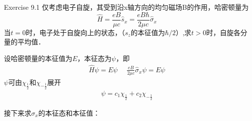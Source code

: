 
Exercise 9.1 仅考虑电子自旋，其受到沿x轴方向的均匀磁场B的作用，哈密顿量为
$$
\hat{H}=\frac{e B}{\mu c} \hat{s}_{x}=\frac{e B \hbar}{2 \mu c} \hat{\sigma}_{x}
$$
当$t=0$时，电子处于自旋向上的状态，（$\hat{s}_z$的本征值为$\hbar/2$）,求$t>0$时，自旋各分量的平均值．

设哈密顿量的本征值为$E$，本征态为$\psi$，即
\begin{align}
	\hat{H}\psi =E\psi \,\,\quad
	\frac{eB}{2\mu c}\hat{\sigma}_x\psi =E\psi
\end{align}
$\psi$可由$\chi _{\frac{1}{2}}$和$\chi _{-\frac{1}{2}}$展开
\begin{align}
	\psi =c_1\chi _{\frac{1}{2}}+c_2\chi _{-\frac{1}{2}}
\end{align}

接下来求$\hat{\sigma}_x$的本征态和本征值：

